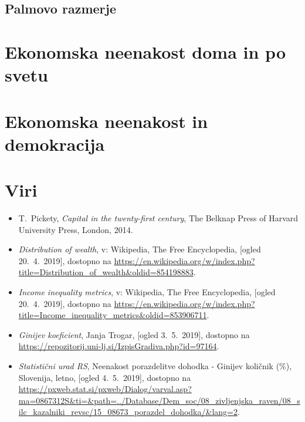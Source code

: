 \documentclass[a4paper,12 pt]{article}
\begin{document}
\subsection[Palmovo razmerje]{Palmovo razmerje}

\newpage

\section[Ekonomska neenakost doma in po svetu]{Ekonomska neenakost doma in po svetu}

\newpage

\section[Ekonomska neenakost in demokracija]{Ekonomska neenakost in demokracija}

\newpage

\section[Viri]{Viri}

\begin{itemize}
\item
\label{Pickety}
T.~Pickety, \emph{Capital in the twenty-first century}, The Belknap Press of Harvard University Press, London, 2014.

\item 
\label{Razdelitev premoženja}
\emph{Distribution of wealth}, v: Wikipedia, The Free Encyclopedia, [ogled 20.~4.~2019], dostopno na \url{https://en.wikipedia.org/w/index.php?title=Distribution_of_wealth&oldid=854198883}.

\item 
\label{Metrike ekonomske neenakosti}
\emph{Income inequality metrics}, v: Wikipedia, The Free Encyclopedia, [ogled 20.~4.~2019], dostopno na \url{https://en.wikipedia.org/w/index.php?title=Income_inequality_metrics&oldid=853906711}.

\item
\emph{Ginijev koeficient}, Janja Trogar, [ogled 3.~5.~2019], dostopno na \url{https://repozitorij.uni-lj.si/IzpisGradiva.php?id=97164}.

\item
\emph{Statistični urad RS}, Neenakost porazdelitve dohodka - Ginijev količnik (\%), Slovenija, letno, [ogled 4.~5.~2019], dostopno na \url{https://pxweb.stat.si/pxweb/Dialog/varval.asp?ma=0867312S&ti=&path=../Database/Dem_soc/08_zivljenjska_raven/08_silc_kazalniki_revsc/15_08673_porazdel_dohodka/&lang=2}.
\end{itemize}
\end{document}
